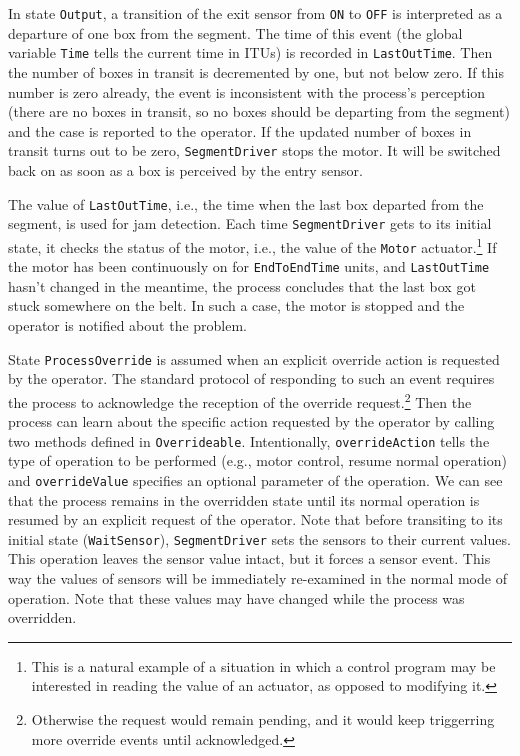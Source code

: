 In state {\tt Output}, a transition of the exit sensor from {\tt ON} to
{\tt OFF} is interpreted as a departure of one box from the segment.
The time of this event
(the global variable {\tt Time} tells the current time in ITUs)
is recorded in {\tt LastOutTime}.
Then the number of boxes in transit is decremented by one, but not below
zero.
If this number is zero already, the event is inconsistent with the process's
perception (there are no boxes in transit, so no boxes should be departing
from the segment) and the case is reported to the operator.
If the updated number of boxes in transit turns out to be zero,
{\tt SegmentDriver} stops the motor.
It will be switched back on as soon as a box is perceived by the entry
sensor.

The value of {\tt LastOutTime}, i.e., the time when the last box departed
from the segment, is used for jam detection.
Each time {\tt SegmentDriver} gets to its initial state,
it checks the status of the motor, i.e., the value of the {\tt Motor}
actuator.\footnote{This is a natural example of a situation in which a
control program may be interested in reading the value of an actuator,
as opposed to modifying it.}
If the motor has been continuously on for {\tt EndToEndTime} units,
and {\tt LastOutTime} hasn't changed in the meantime, the process concludes
that the last box got stuck somewhere on the belt.
In such a case, the motor is stopped and the operator is notified about the
problem.

State {\tt ProcessOverride} is assumed when an explicit override
action is requested by the operator.
The standard protocol of responding to such an event requires the process
to acknowledge the reception of the override request.\footnote{Otherwise
the request would remain pending, and it would keep triggerring more
override events until acknowledged.}
Then the process can learn about the specific action requested by the
operator by calling two methods defined in {\tt Overrideable}.
Intentionally, {\tt overrideAction} tells the type of operation to be
performed (e.g., motor control, resume normal operation) and
{\tt overrideValue} specifies an optional parameter of the operation.
We can see that the process remains in the overridden state until its
normal operation is resumed by an explicit request of the operator.
Note that before transiting to its initial state ({\tt WaitSensor}),
{\tt SegmentDriver} sets the sensors to their current values.
This operation leaves the sensor value intact, but it forces
a sensor event.
This way the values of sensors
will be immediately re-examined in the normal mode of operation.
Note that these values may have changed while the process was overridden.

